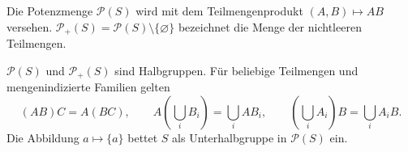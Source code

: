 \begin{definition}[Potenzhalbgruppe]
Die Potenzmenge $\mathcal P(S)$ wird mit dem Teilmengenprodukt
$(A,B)\mapsto AB$ versehen.
$\mathcal P_+(S)=\mathcal P(S)\setminus\{\varnothing\}$
bezeichnet die Menge der nichtleeren Teilmengen.
\end{definition}

\begin{theorem}
\label{b28guide:thm:powerset}
$\mathcal P(S)$ und $\mathcal P_+(S)$ sind Halbgruppen.
Für beliebige Teilmengen und mengenindizierte Familien gelten
\[
 (AB)C=A(BC),\qquad
 A\left(\bigcup_i B_i\right)=\bigcup_i AB_i,\qquad
 \left(\bigcup_i A_i\right)B=\bigcup_i A_iB.
\]
Die Abbildung $a\mapsto\{a\}$ bettet $S$ als Unterhalbgruppe
in $\mathcal P(S)$ ein.
\cite{projectpower,howie}
\end{theorem}
